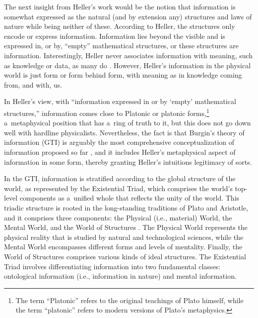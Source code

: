 The next insight from Heller's work would be the notion that information is somewhat expressed as the natural (and by extension any) structures and laws of nature while being neither of these. According to Heller, the structures only encode or express information. Information lies beyond the visible and is expressed in, or by, ``empty'' mathematical structures, or these structures are information. Interestingly, Heller never associates information with meaning, such as knowledge or data, as many do 
\parencites[e.g][]{losee_discipline_1997}[][]{sveiby_what_1998}[][]{casagrande_information_1999}[][]{dretske_knowledge_1999}[][]{floridi_information_2010}[][]{floridi_philosophy_2011}[][]{floridi_semantic_2019}[][]{lenski_information_2010}[][]{vernon_artificial_2014}. %
 However, Heller's information in the physical world is just form or form behind form, with meaning as in knowledge coming from, and with, us.



In Heller's view, with ``information expressed in or by ‘empty' mathematical structures,'' information comes close to Platonic or platonic forms,\footnote{The term ``Platonic'' refers to the original teachings of Plato himself, while the term ``platonic'' refers to modern versions of Plato's metaphysics.} a~metaphysical position that has a~ring of truth to it, but this does not go down well with hardline physicalists. Nevertheless, the fact is that Burgin's theory of information (GTI) is arguably the most comprehensive conceptualization of information proposed so far 
\parencites[][]{burgin_information_2003}[][]{burgin_theory_2010}[][]{burgin_structural_2017}[][]{burgin_structural_2017}[][]{burgin_is_2022}, %
 and it includes Heller's metaphysical aspect of information in some form, thereby granting Heller's intuitions legitimacy of sorts.



In the GTI, information is stratified according to the global structure of the world, as represented by the Existential Triad, which comprises the world's top-level components as a~unified whole that reflects the unity of the world. This triadic structure is rooted in the long-standing traditions of Plato and Aristotle, and it comprises three components: the Physical (i.e., material) World, the Mental World, and the World of Structures 
\parencites[][]{burgin_theory_2010}[][]{burgin_structural_2017}. %
 The Physical World represents the physical reality that is studied by natural and technological sciences, while the Mental World encompasses different forms and levels of mentality. Finally, the World of Structures comprises various kinds of ideal structures. The Existential Triad involves differentiating information into two fundamental classes: ontological information (i.e., information in nature) and mental information.



